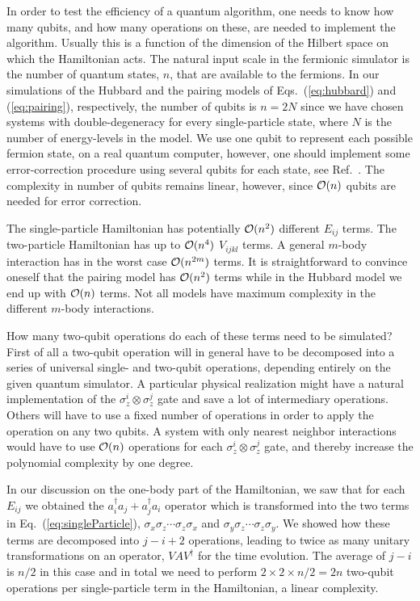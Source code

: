 \documentclass[aps,pra,twocolumn,floatfix]{revtex4}
\begin{document}
In order to test the efficiency of a quantum algorithm, one needs to know how many
qubits, and how many operations on these, are  needed to implement the
algorithm.  Usually this is a 
function of the dimension of the Hilbert space on which the
Hamiltonian acts. The natural input scale 
in the fermionic simulator is the number of quantum states, $n$, that are
available to the fermions.
In our simulations  of the Hubbard and the pairing
models of Eqs.~(\ref{eq:hubbard}) and (\ref{eq:pairing}), respectively, 
the number of qubits is $n=2N$ since we have chosen systems with 
double-degeneracy for every single-particle state, where $N$ is the
number of energy-levels in the model.
We use one qubit to represent each possible fermion state,
on a real quantum computer, however, one should implement some
error-correction procedure using several qubits for each state, see
Ref.~\cite{nielsen2000}. 
The complexity in number of qubits remains linear, however, since ${\cal O} (n)$
qubits are needed for error correction.

The single-particle Hamiltonian has  potentially ${\cal O} (n^2)$
different $E_{ij}$ terms. The two-particle Hamiltonian has up to
${\cal O} (n^4)$ $V_{ijkl}$ terms. A general $m$-body interaction has
in the worst case  ${\cal O} (n^{2m})$ terms. It is straightforward to
convince oneself that the
pairing model has  ${\cal O} (n^2)$ terms  while
in the Hubbard model we end up with   ${\cal O}
(n)$ terms. Not all models have maximum complexity in the different
$m$-body interactions.

How many two-qubit operations do each of these terms need to be
simulated? First of all a two-qubit operation will in general have to
be decomposed into a series of universal single- and two-qubit
operations, depending entirely on the given quantum simulator. A particular
physical realization might have a natural implementation of the
$\sigma_z^i\otimes \sigma_z^j$ gate and save a lot of intermediary
operations.
Others will have to use a fixed number of operations in order to apply  the
operation on any two qubits. A system with only nearest neighbor
interactions would have to use ${\cal O}(n)$ operations for each
$\sigma_z^i\otimes \sigma_z^j$ gate, and thereby increase the
polynomial complexity by one degree. 

In our discussion on the one-body part of the Hamiltonian, 
we saw that for each $E_{ij}$ we obtained the
$a^\dag_ia_j + a^\dag_j a_i$ operator which is transformed into the
two terms in Eq.~(\ref{eq:singleParticle}), 
$\sigma_x\sigma_z\cdots\sigma_z \sigma_x$ and 
$\sigma_y\sigma_z\cdots\sigma_z \sigma_y$. 
We  showed how these terms are
decomposed into $j-i+2$ operations, leading to twice as many 
unitary transformations on an operator, $VAV^\dag$ for the time evolution.
The average of $j-i$ is $n/2$ in this case and in total we need to
perform $2\times 2\times n/2 = 2n$ two-qubit operations per
single-particle term in the Hamiltonian, a linear complexity.
\end{document}
